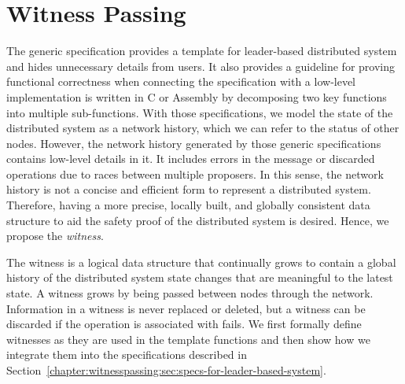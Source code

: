 \section{Witness Passing}
\label{chapter:witnesspassing:sec:witness-passing}
The generic specification provides a template for leader-based distributed
system and hides unnecessary details from users. It also provides a guideline 
for proving functional correctness when connecting the specification with a 
low-level implementation is written in C or Assembly by decomposing 
two key functions into multiple sub-functions.
With those specifications,  we model the state of the distributed system as a network history, which we can refer to the status of other nodes.
However, the network history generated by those generic specifications contains low-level details in it.
It includes errors in the message or discarded operations due to races between multiple proposers.
In this sense, the network history is not a concise and efficient form to represent a distributed system. 
Therefore, having a more precise, 
locally built, and globally consistent data structure to aid the safety proof of the distributed system is desired. Hence, we propose the \textit{witness}.

The witness is a logical data structure that continually grows to contain a global
history of the distributed system state changes that are meaningful to the
latest state. A witness grows by being passed between nodes through the network.
Information in a witness is never replaced or deleted, but a witness can be discarded if the operation is associated with fails.
We first formally define witnesses as they are used in the template functions
and then show how we integrate them into the specifications described in Section~\ref{chapter:witnesspassing:sec:specs-for-leader-based-system}.



